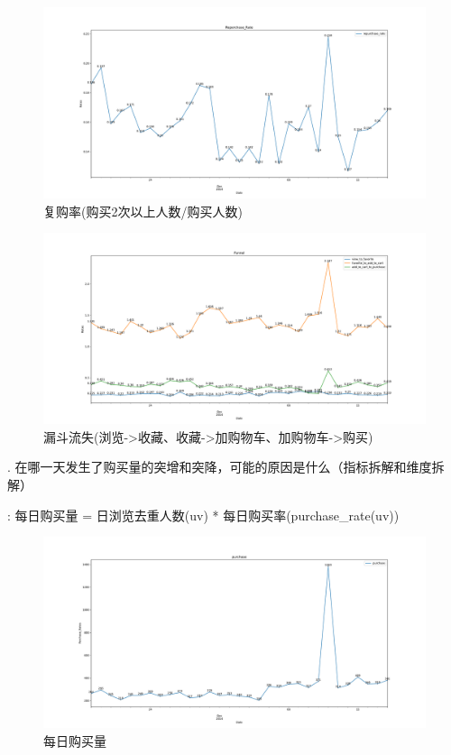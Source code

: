 \documentclass[a4paper]{article}
\begin{document}
\begin{figure}[H]
	\centering
	\includegraphics[width=1\textwidth]{./reperchase_rate.pdf}
	\caption{复购率(购买2次以上人数/购买人数)}
	\label{Fig.repurchase_rate}
\end{figure}

\begin{figure}[H]
	\centering
	\includegraphics[width=1\textwidth]{./funnel.pdf}
	\caption{漏斗流失(浏览->收藏、收藏->加购物车、加购物车->购买)}
	\label{Fig.funnel}
\end{figure}

\newpage

. 在哪一天发生了购买量的突增和突降，可能的原因是什么（指标拆解和维度拆解）

{}: 每日购买量 = 日浏览去重人数(uv) * 每日购买率(purchase\_rate(uv))

\begin{figure}[H]
	\centering
	\includegraphics[width=1\textwidth]{./purchase.pdf}
	\caption{每日购买量}
\end{figure}
\end{document}
